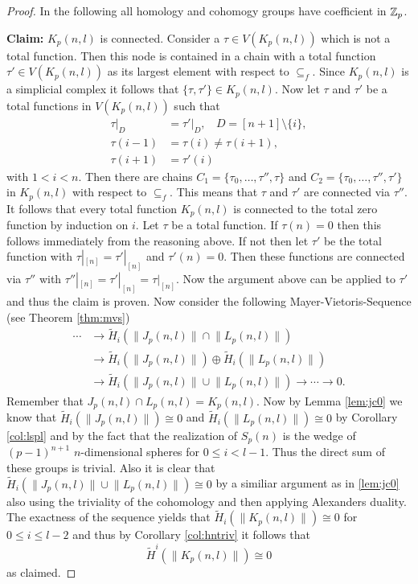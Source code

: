 \begin{proof}
  In the following all homology and cohomogy groups have coefficient in $\mathbb{Z}_p$.

  \textbf{Claim:} $K_p(n,l)$ is connected. Consider a $\tau \in V(K_p(n,l))$ which is not a total function. Then this node is contained in a chain with a total function $\tau' \in V(K_p(n,l))$ as its largest element with respect to $\subseteq_f$. Since $K_p(n,l)$ is a simplicial complex it follows that $\{\tau, \tau'\} \in K_p(n,l)$.
  Now let $\tau$ and $\tau'$ be a total functions in $V(K_p(n,l))$ such that
  \begin{align*}
    \tau|_D &= \tau'|_D, \:\:\:\: D = [n+1]\setminus \{i\}, \\
    \tau(i-1) &= \tau(i) \neq \tau(i+1), \\
    \tau(i+1) &= \tau'(i)
  \end{align*}
  with $1 < i < n$.
  Then there are chains $C_1 = \{\tau_0, \ldots, \tau'', \tau\}$ and $C_2 = \{\tau_0, \ldots, \tau'', \tau' \}$ in $K_p(n,l)$ with respect to $\subseteq_f$. This means that $\tau$ and $\tau'$ are connected via $\tau''$.
  It follows that every total function $K_p(n,l)$ is connected to the total zero function by induction on $i$. Let $\tau$ be a total function. If $\tau(n) = 0$ then this follows immediately from the reasoning above. If not then let $\tau'$ be the total function with $\tau|_{[n]} = \tau'|_{[n]}$ and $\tau'(n) = 0$. Then these functions are connected via $\tau''$ with $\tau''|_{[n]} = \tau'|_{[n]} = \tau|_{[n]}$. Now the argument above can be applied to $\tau'$ and thus the claim is proven.
  Now consider the following Mayer-Vietoris-Sequence (see Theorem \ref{thm:mvs})
  \begin{align*}
    \label{eq:mayvietk}
    \cdots &\to \tilde{H}_i(\lVert J_p(n,l) \rVert \cap \lVert L_p(n,l)\rVert) \\ &\to \tilde{H}_i(\lVert J_p(n,l)\rVert) \oplus \tilde{H}_i(\lVert L_p(n,l) \rVert) \\ &\to \tilde{H}_i(\lVert J_p(n,l)\rVert \cup \lVert L_p(n,l) \rVert) \to \cdots \to 0.
  \end{align*}
  Remember that $J_p(n,l) \cap L_p(n,l) = K_p(n,l)$. Now by Lemma \ref{lem:jc0} we know that $\tilde{H}_i(\lVert J_p(n,l)\rVert) \cong 0$ and $\tilde{H}_i(\lVert L_p(n,l)\rVert) \cong 0$ by Corollary \ref{col:lspl} and by the fact that the realization of $S_p(n)$ is the wedge of $(p-1)^{n+1}$ $n$-dimensional spheres for $0 \leq i < l-1$. Thus the direct sum of these groups is trivial. Also it is clear that $\tilde{H}_i(\lVert J_p(n,l)\rVert \cup \lVert L_p(n,l)\rVert) \cong 0$ by a similiar argument as in \ref{lem:jc0} also using the triviality of the cohomology and then applying Alexanders duality. The exactness of the sequence yields that $\tilde{H}_i(\lVert K_p(n,l)\rVert) \cong 0$ for $0 \leq i \leq l-2$ and thus by Corollary \ref{col:hntriv} it follows that \[\tilde{H}^i(\lVert K_p(n,l)\rVert) \cong 0\] as claimed.
\end{proof}


